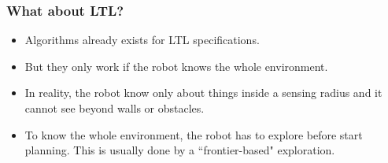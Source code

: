 \documentclass{if-beamer}
\begin{document}
\begin{frame}
	\frametitle{What about LTL?}
	\begin{itemize}
		\item Algorithms already exists for LTL specifications.\\
		\pause
		\item But they only work if the robot knows the whole environment.\\
		\pause
		\item In reality, the robot know only about things inside a sensing radius and it cannot see beyond walls or obstacles.
		\pause
		\item To know the whole environment, the robot has to explore before start planning. This is usually done by a ``frontier-based" exploration.\\
	\end{itemize}
\end{frame}

\end{document}
